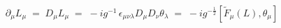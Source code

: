 \begin{equation}\label{eq:global}
\partial_\mu L_\mu \;=\; D_\mu L_\mu \;=\; -i g^{-1} \, \epsilon_{\mu\nu\lambda} 
D_\mu D_\nu \theta_\lambda \;=\;  -i g^{-\frac{1}{2}} [ {\tilde F}_\mu (L),
\theta_\mu ]  
\end{equation}

